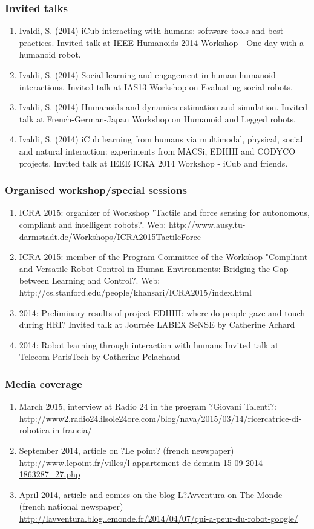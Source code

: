 \subsubsection{Invited talks}
\begin{enumerate}
\item Ivaldi, S. (2014) iCub interacting with humans: software tools and best practices. Invited talk at IEEE Humanoids 2014 Workshop - One day with a humanoid robot.
\item Ivaldi, S. (2014) Social learning and engagement in human-humanoid interactions. Invited talk at IAS13 Workshop on Evaluating social robots.
\item  Ivaldi, S. (2014) Humanoids and dynamics estimation and simulation. Invited talk at French-German-Japan Workshop on Humanoid and Legged robots.
\item Ivaldi, S. (2014) iCub learning from humans via multimodal, physical, social and natural interaction: experiments from MACSi, EDHHI and CODYCO projects. Invited talk at IEEE ICRA 2014 Workshop - iCub and friends.
\end{enumerate}


\subsubsection{Organised workshop/special sessions}
\begin{enumerate}
\item  ICRA 2015: organizer of Workshop "Tactile and force sensing for autonomous, compliant and intelligent robots?. Web: http://www.ausy.tu-darmstadt.de/Workshops/ICRA2015TactileForce 
\item  ICRA 2015: member of the Program Committee of the Workshop "Compliant and Versatile Robot Control in Human Environments: Bridging the Gap between Learning and Control?. Web: http://cs.stanford.edu/people/khansari/ICRA2015/index.html 
\item  2014: Preliminary results of project EDHHI: where do people gaze and touch during HRI?
Invited talk at Journée LABEX SeNSE by Catherine Achard
\item  2014: Robot learning through interaction with humans
Invited talk at Telecom-ParisTech by Catherine Pelachaud
\end{enumerate}


\subsubsection{Media coverage}
\begin{enumerate}
\item  March 2015, interview at Radio 24 in the program ?Giovani Talenti?:
http://www2.radio24.ilsole24ore.com/blog/nava/2015/03/14/ricercatrice-di-robotica-in-francia/
\item  September 2014, article on ?Le point? (french newspaper)
\url{http://www.lepoint.fr/villes/l-appartement-de-demain-15-09-2014-1863287_27.php}
\item  April 2014, article and comics on the blog L?Avventura on The Monde (french national newspaper) \url{http://lavventura.blog.lemonde.fr/2014/04/07/qui-a-peur-du-robot-google/}
\end{enumerate}

